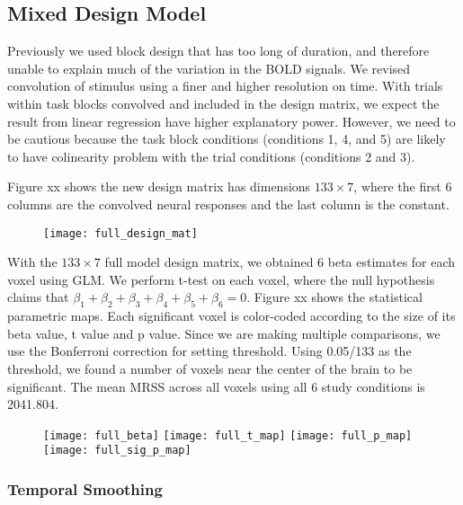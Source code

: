 \subsection{Mixed Design Model} 

Previously we used block design that has too long of duration, and therefore
unable to explain much of the variation in the BOLD signals. We revised
convolution of stimulus using a finer and higher resolution on time. With trials
within task blocks convolved and included in the design matrix, we expect the
result from linear regression have higher explanatory power. However, we need to
be cautious because the task block conditions (conditions 1, 4, and 5) are
likely to have colinearity problem with the trial conditions (conditions 2 and
3).

Figure xx shows the new design matrix has dimensions $133 \times 7$, where the
first 6 columns are the convolved neural responses and the last column is the
constant.  

\begin{figure} \texttt{[image: full\_design\_mat]} \end{figure}


With the $133 \times 7$ full model design matrix, we obtained 6 beta estimates
for each voxel using GLM. We perform t-test on each voxel, where the null
hypothesis claims that $\beta_1 + \beta_2 + \beta_3 + \beta_4 + \beta_5 +
\beta_6= 0$. Figure xx shows the statistical parametric maps. Each significant voxel is
color-coded according to the size of its beta value, t value and p value. Since
we are making multiple comparisons, we use the Bonferroni correction for setting
threshold. Using 0.05/133 as the threshold, we found a number of voxels near the
center of the brain to be significant. The mean MRSS across all voxels using all
6 study conditions is 2041.804.

\begin{figure} 
  
  \texttt{[image: full\_beta]}
  \texttt{[image: full\_t\_map]}
  \texttt{[image: full\_p\_map]}
  \texttt{[image: full\_sig\_p\_map]} 

\end{figure}

\subsubsection{Temporal Smoothing}

